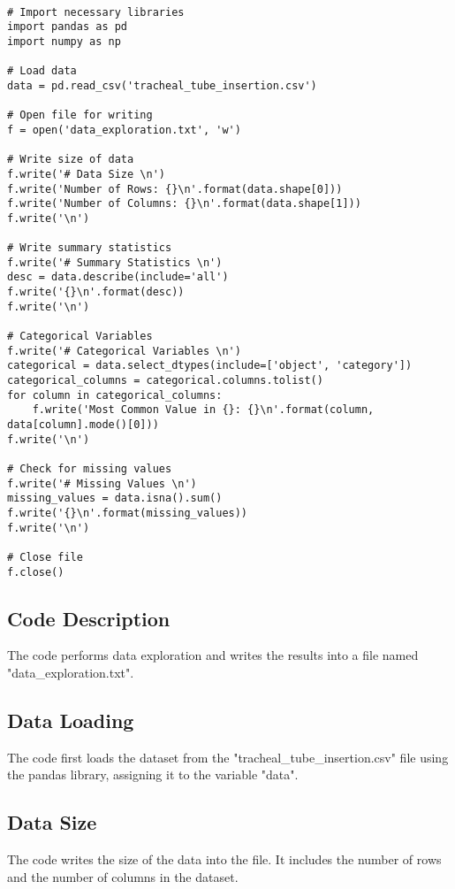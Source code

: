 \documentclass[11pt]{article}
\begin{document}
\begin{verbatim}

# Import necessary libraries
import pandas as pd
import numpy as np

# Load data
data = pd.read_csv('tracheal_tube_insertion.csv')

# Open file for writing
f = open('data_exploration.txt', 'w')

# Write size of data
f.write('# Data Size \n')
f.write('Number of Rows: {}\n'.format(data.shape[0]))
f.write('Number of Columns: {}\n'.format(data.shape[1]))
f.write('\n')

# Write summary statistics
f.write('# Summary Statistics \n')
desc = data.describe(include='all')
f.write('{}\n'.format(desc))
f.write('\n')

# Categorical Variables
f.write('# Categorical Variables \n')
categorical = data.select_dtypes(include=['object', 'category'])
categorical_columns = categorical.columns.tolist()
for column in categorical_columns:
    f.write('Most Common Value in {}: {}\n'.format(column, data[column].mode()[0]))
f.write('\n')

# Check for missing values
f.write('# Missing Values \n')
missing_values = data.isna().sum()
f.write('{}\n'.format(missing_values))
f.write('\n')

# Close file
f.close()

\end{verbatim}

\subsection{Code Description}

The code performs data exploration and writes the results into a file named "data\_exploration.txt". 

\subsection{Data Loading}
The code first loads the dataset from the "tracheal\_tube\_insertion.csv" file using the pandas library, assigning it to the variable "data".

\subsection{Data Size}
The code writes the size of the data into the file. It includes the number of rows and the number of columns in the dataset.
\end{document}
